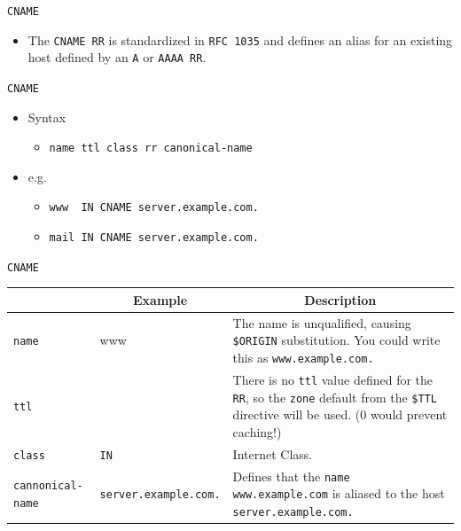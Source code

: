 \documentclass[aspectratio=169,xcolor=table]{beamer}
\begin{document}
\begin{frame}{\texttt{CNAME}}
  \begin{itemize}
      \item The \texttt{CNAME RR} is standardized in \texttt{RFC 1035} and defines an alias for an existing host defined by an \texttt{A} or \texttt{AAAA RR}.
  \end{itemize}
\end{frame}

\begin{frame}{\texttt{CNAME}}
  \begin{itemize}
    \item Syntax
      \begin{itemize}
        \item \texttt{name ttl class rr canonical-name}
      \end{itemize}
    \item e.g.
      \begin{itemize}
        \item \texttt{www ~IN CNAME server.example.com.}
        \item \texttt{mail IN CNAME server.example.com.}
      \end{itemize}
  \end{itemize}
\end{frame}

\begin{frame}{\texttt{CNAME}}
  \begin{table}
    \tiny
    \begin{tabular}{|p{1.6cm}|p{1.9cm}|p{5.7cm}|} 
      \hline
      \rowcolor{gray}
      \multicolumn{1}{|c|}{Syntax} & \multicolumn{1}{c|}{Example} & \multicolumn{1}{c|}{Description}\\ 
      \hline
      \texttt{name}&www&The name is unqualified, causing \texttt{\$ORIGIN} substitution. You could write this as \texttt{www.example.com.}\\
      \hline
      \texttt{ttl}&&There is no \texttt{ttl} value defined for the \texttt{RR}, so the \texttt{zone} default from the \texttt{\$TTL} directive will be used. (0 would prevent caching!)\\
      \hline
      \texttt{class}&\texttt{IN}&Internet Class.\\
      \hline
      \texttt{cannonical-name}&\texttt{server.example.com.}&Defines that the \texttt{name www.example.com} is aliased to the host \texttt{server.example.com.}\\
      \hline
    \end{tabular}
  \end{table}
\end{frame}
\end{document}

